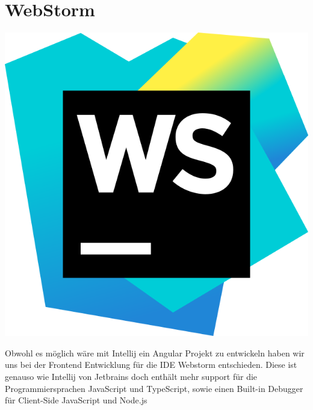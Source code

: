 \section{WebStorm}
\includegraphics[scale=0.025]{pics/logos/WebStormLogo.png}


Obwohl es möglich wäre mit Intellij ein Angular Projekt zu entwickeln haben wir uns bei der Frontend Entwicklung 
für die IDE Webstorm entschieden. Diese ist genauso wie Intellij von Jetbrains doch enthält mehr support für die 
Programmiersprachen JavaScript und TypeScript, sowie einen Built-in Debugger für Client-Side JavaScript und Node.js 


